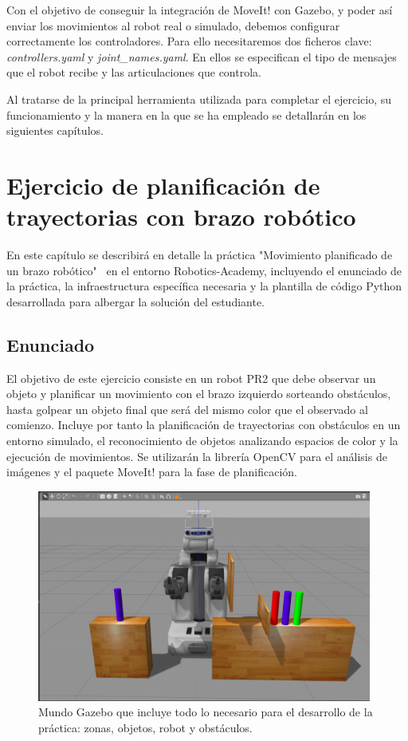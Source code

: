 \documentclass[12pt,spanish,chapterprefix, numbers=noenddot]{book}
\numberwithin{equation}{section}
\numberwithin{figure}{section}
\begin{document}
Con el objetivo de conseguir la integración de MoveIt! con Gazebo, y poder así enviar los movimientos al robot real o simulado, debemos configurar correctamente los controladores. Para ello necesitaremos dos ficheros clave: \textit{controllers.yaml} y \textit{joint\_names.yaml}.  En ellos se especifican el tipo de mensajes que el robot recibe y las articulaciones que controla.  

Al tratarse de la principal herramienta utilizada para completar el ejercicio, su funcionamiento y la manera en la que se ha empleado se detallarán en los siguientes capítulos.

\chapter{Ejercicio de planificación de trayectorias con brazo robótico}
En este capítulo se describirá en detalle la práctica "Movimiento planificado de un brazo robótico" \ en el entorno Robotics-Academy, incluyendo el enunciado de la práctica, la infraestructura específica necesaria y la plantilla de código Python desarrollada para albergar la solución del estudiante. 

\section{Enunciado}
 El objetivo de este ejercicio consiste en un robot PR2 que debe observar un objeto y planificar un movimiento con el brazo izquierdo sorteando obstáculos, hasta golpear un objeto final que será del mismo color que el observado al comienzo. Incluye por tanto la planificación de trayectorias con obstáculos en un entorno simulado, el reconocimiento de objetos analizando espacios de color y la ejecución de movimientos. Se utilizarán la librería OpenCV para el análisis de imágenes y el paquete MoveIt! para la fase de planificación. 

\begin{figure}[hbt!]
\centering
\includegraphics[width=11cm]{Figs/tfg_gazebo_world.png}
\par
\caption{\label{fig:Mundo-gazebo}Mundo Gazebo que incluye todo lo necesario para el desarrollo de la práctica: zonas, objetos, robot y obstáculos.}
\end{figure}
\end{document}
